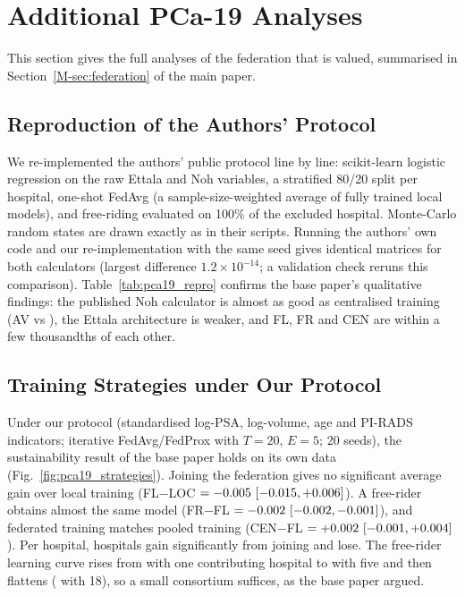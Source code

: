 \section{Additional PCa-19 Analyses}
\label{sec:pca19_more}
This section gives the full analyses of the federation that is valued, summarised in Section~\ref{M-sec:federation} of the main paper.

\subsection{Reproduction of the Authors' Protocol}
\label{sec:p19_repro}
We re-implemented the authors' public protocol line by line: scikit-learn logistic regression on the raw Ettala and Noh variables, a stratified 80/20 split per hospital, one-shot FedAvg (a sample-size-weighted average of fully trained local models), and free-riding evaluated on 100\% of the excluded hospital. Monte-Carlo random states are drawn exactly as in their scripts. Running the authors' own code and our re-implementation with the same seed gives identical matrices for both calculators (largest difference $1.2\times10^{-14}$; a validation check reruns this comparison). Table~\ref{tab:pca19_repro} confirms the base paper's qualitative findings: the published Noh calculator is almost as good as centralised training (AV \pRepNohBL{} vs \pRepNohCEN{}), the Ettala architecture is weaker, and FL, FR and CEN are within a few thousandths of each other.



\subsection{Training Strategies under Our Protocol}
Under our protocol (standardised log-PSA, log-volume, age and PI-RADS indicators; iterative FedAvg/FedProx with $T=20$, $E=5$; 20 seeds), the sustainability result of the base paper holds on its own data (Fig.~\ref{fig:pca19_strategies}). Joining the federation gives no significant average gain over local training (FL$-$LOC $=-0.005\ [-0.015, +0.006]$). A free-rider obtains almost the same model (FR$-$FL $=-0.002\ [-0.002, -0.001]$), and federated training matches pooled training (CEN$-$FL $=+0.002\ [-0.001, +0.004]$). Per hospital, \pGainSig{} hospitals gain significantly from joining and \pLossSig{} lose. The free-rider learning curve rises from \pLcFrOne{} with one contributing hospital to \pLcFrFive{} with five and then flattens (\pLcFrLast{} with 18), so a small consortium suffices, as the base paper argued.

